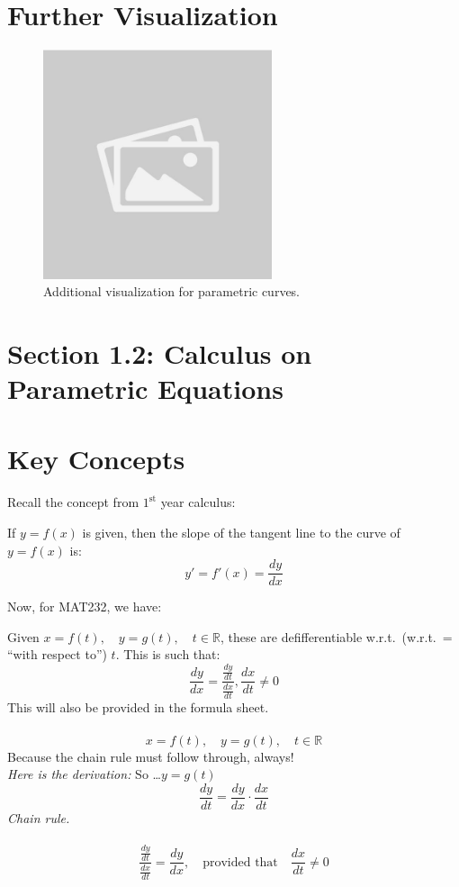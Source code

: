 \documentclass{article}
\begin{document}
\section*{Further Visualization}
\begin{figure}[H]
    \centering
    \includegraphics[width=0.6\textwidth]{sample_image2.jpg}
    \caption{Additional visualization for parametric curves.}
    \label{fig:sample_image2}
\end{figure}

\section*{Section 1.2: Calculus on Parametric Equations}
\section*{Key Concepts}
Recall the concept from $1^{\text{st}}$ year calculus:
\begin{definitionbox}
If \( y = f(x) \) is given, then the slope of the tangent line to the curve of \( y = f(x) \) is:
\[
    y' = f'(x) = \frac{dy}{dx}
\]
\end{definitionbox}
Now, for MAT232, we have:
\begin{definitionbox}
Given \( x = f(t), \quad y = g(t), \quad t \in \mathbb{R} \), these are defifferentiable w.r.t.\ (w.r.t.\ = ``with respect to'') \( t \). This is such that:
\[
    \frac{dy}{dx} = \frac{\frac{dy}{dt}}{\frac{dx}{dt}}, \frac{dx}{dt} \neq 0
\]
This will also be provided in the formula sheet. \\
\\
\[
    x = f(t), \quad y = g(t), \quad t \in \mathbb{R}
\]
Because the chain rule must follow through, always! \\
\textit{Here is the derivation:}
So \dots \( y = g(t) \) \\
\[
     \frac{dy}{dt} = \frac{dy}{dx} \cdot \frac{dx}{dt}
\]
\textit{Chain rule.} \\
\\
\[
    \frac{\frac{dy}{dt}}{\frac{dx}{dt}} = \frac{dy}{dx}, \quad \text{provided that} \quad \frac{dx}{dt} \neq 0
\]
\end{definitionbox}
\end{document}
